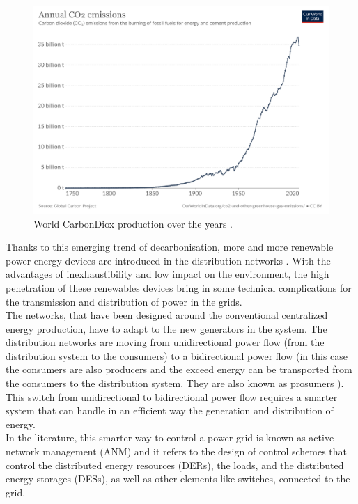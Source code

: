 \begin{figure}[H]
\centering
    \includegraphics[width=.7\linewidth]{images/Introduction/annual-co2-emissions-per-country.pdf}
\caption[\gls{CarbonDiox} production over the years]{World \gls{CarbonDiox} production over the years \cite{C02prod}.}
\end{figure}

Thanks to this emerging trend of decarbonisation, more and more renewable power energy devices are introduced in the distribution networks \cite{owidenergy}. With the advantages of inexhaustibility and low impact on the environment, the high penetration of these renewables devices bring in some technical complications for the transmission and distribution of power in the grids. \\
The networks, that have been designed around the conventional centralized energy production, have to adapt to the new generators in the system. The distribution networks are moving from unidirectional power flow (from the distribution system to the consumers) to a bidirectional power flow (in this case the consumers are also producers and the exceed energy can be transported from the consumers to the distribution system. They are also known as prosumers \cite{prosumers}). This switch from unidirectional to bidirectional power flow requires a smarter system that can handle in an efficient way the generation and distribution of energy.\\

In the literature, this smarter way to control a power grid is known as active network management (\gls{ANM}) and it refers to the design of control schemes that control the distributed energy resources (\glspl{DER}), the loads, and the distributed energy storages (\glspl{DES}), as well as other elements like switches, connected to the grid. \\



